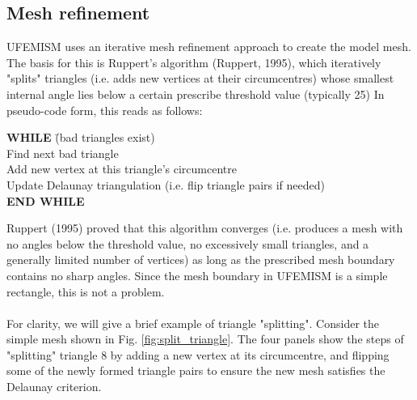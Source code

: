 \documentclass{article}
\begin{document}
\newpage
\subsection{Mesh refinement}

UFEMISM uses an iterative mesh refinement approach to create the model mesh. The basis for this is Ruppert's algorithm (Ruppert, 1995), which iteratively "splits" triangles (i.e. adds new vertices at their circumcentres) whose smallest internal angle lies below a certain prescribe threshold value (typically 25\degree) In pseudo-code form, this reads as follows:

\begin{tabbing}
\textbf{WHILE} \=(bad triangles exist)\\
\> Find next bad triangle\\
\> Add new vertex at this triangle's circumcentre\\
\> Update Delaunay triangulation (i.e. flip triangle pairs if needed)\\
\textbf{END WHILE}
\end{tabbing}

Ruppert (1995) proved that this algorithm converges (i.e. produces a mesh with no angles below the threshold value, no excessively small triangles, and a generally limited number of vertices) as long as the prescribed mesh boundary contains no sharp angles. Since the mesh boundary in UFEMISM is a simple rectangle, this is not a problem.\\
\\
For clarity, we will give a brief example of triangle "splitting". Consider the simple mesh shown in Fig. \ref{fig:split_triangle}. The four panels show the steps of "splitting" triangle 8 by adding a new vertex at its circumcentre, and flipping some of the newly formed triangle pairs to ensure the new mesh satisfies the Delaunay criterion.
\end{document}
